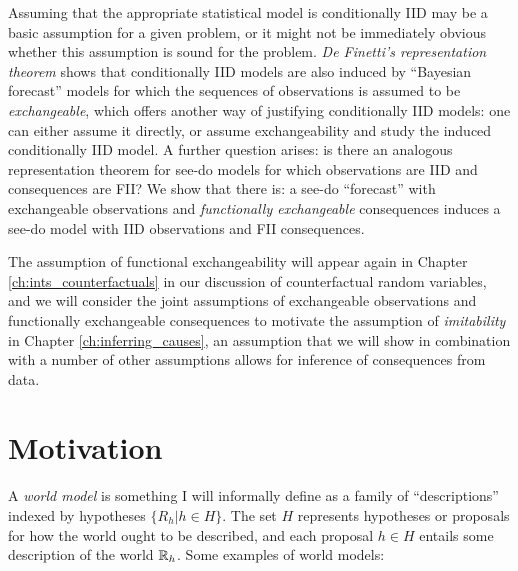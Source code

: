 Assuming that the appropriate statistical model is conditionally IID may be a basic assumption for a given problem, or it might not be immediately obvious whether this assumption is sound for the problem. \emph{De Finetti's representation theorem} shows that conditionally IID models are also induced by ``Bayesian forecast'' models for which the sequences of observations is assumed to be \emph{exchangeable}, which offers another way of justifying conditionally IID models: one can either assume it directly, or assume exchangeability and study the induced conditionally IID model. A further question arises: is there an analogous representation theorem for see-do models for which observations are IID and consequences are FII? We show that there is: a see-do ``forecast'' with exchangeable observations and \emph{functionally exchangeable} consequences induces a see-do model with IID observations and FII consequences.

The assumption of functional exchangeability will appear again in Chapter \ref{ch:ints_counterfactuals} in our discussion of counterfactual random variables, and we will consider the joint assumptions of exchangeable observations and functionally exchangeable consequences to motivate the assumption of \emph{imitability} in Chapter \ref{ch:inferring_causes}, an assumption that we will show in combination with a number of other assumptions allows for inference of consequences from data.


\section{Motivation}

A \emph{world model} is something I will informally define as a family of ``descriptions'' indexed by hypotheses $\{R_h|h\in H\}$. The set $H$ represents hypotheses or proposals for how the world ought to be described, and each proposal $h\in H$ entails some description of the world $\mathbb{R}_h$. Some examples of world models:

